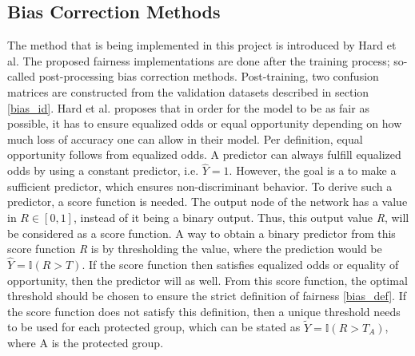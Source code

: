 \documentclass[11pt, fleqn, titlepage]{article}
\begin{document}
	\subsection{Bias Correction Methods}\label{biascorr}
	
	The method that is being implemented in this project is introduced by Hard et al. \cite{equal_of_oppor} The proposed fairness implementations are done after the training process; so-called post-processing bias correction methods. Post-training, two confusion matrices are constructed from the validation datasets described in section \ref{bias_id}. Hard et al. proposes that in order for the model to be as fair as possible, it has to ensure equalized odds or equal opportunity depending on how much loss of accuracy one can allow in their model. Per definition, equal opportunity follows from equalized odds. A predictor can always fulfill equalized odds by using a constant predictor, i.e. $ \hat Y = 1 $. However, the goal is a to make a sufficient predictor, which ensures non-discriminant behavior. To derive such a predictor, a score function is needed. The output node of the network has a value in $ R \in [0,1] $, instead of it being a binary output. Thus, this output value \textit{R}, will be considered as a score function. A way to obtain a binary predictor from this score function \textit{R} is by thresholding the value, where the prediction would be $ \hat Y = \mathbb I (R > T) $. If the score function then satisfies equalized odds or equality of opportunity, then the predictor will as well. From this score function, the optimal threshold should be chosen to ensure the strict definition of fairness \ref{bias_def}. If the score function does not satisfy this definition, then a unique threshold needs to be used for each protected group, which can be stated as $ \tilde Y = \mathbb I ( R > T_A)$, where A is the protected group. 
	
\end{document}
